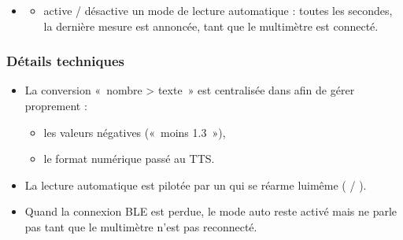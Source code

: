 \documentclass[letterpaper,10pt,french]{sphinxmanual}
\begin{document}
\begin{fulllineitems}
\begin{itemize}
\item {} \begin{description}
\begin{itemize}
\item {} 
\sphinxAtStartPar
active / désactive un mode de lecture automatique :
toutes les  secondes, la dernière
mesure est annoncée, tant que le multimètre est connecté.

\end{itemize}

\end{description}

\end{itemize}


\subsubsection{Détails techniques}
\label{\detokenize{api/modes:details-techniques}}\begin{itemize}
\item {} 
\sphinxAtStartPar
La conversion « nombre \sphinxhyphen{}\textgreater{} texte » est centralisée dans
 afin de gérer proprement :
\begin{itemize}
\item {} 
\sphinxAtStartPar
les valeurs négatives (« moins 1.3 »),

\item {} 
\sphinxAtStartPar
le format numérique passé au TTS.

\end{itemize}

\item {} 
\sphinxAtStartPar
La lecture automatique est pilotée par un 
qui se réarme lui\sphinxhyphen{}même ( / ).

\item {} 
\sphinxAtStartPar
Quand la connexion BLE est perdue, le mode auto reste activé
mais ne parle pas tant que le multimètre n’est pas reconnecté.

\end{itemize}


\end{fulllineitems}
\end{document}
